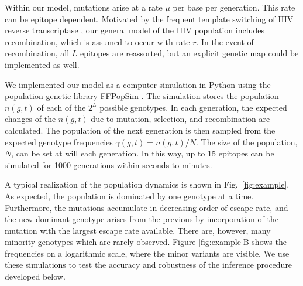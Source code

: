 \documentclass{frontiers}
\newcommand{\FIG}[1]{Fig.~\ref{fig:#1}}
\newcommand{\gt}{g}
\newcommand{\gtfreq}{\gamma}
\begin{document}
Within our model, mutations arise at a rate
$\mu$ per base per generation. This rate can be epitope dependent. 
Motivated by the frequent template switching of HIV reverse transcriptase 
\citep{Levy:2004p23309}, our general
model of the HIV population includes recombination, which is assumed to occur
with rate $r$. In the event of recombination, all $L$ epitopes are
reassorted, but an explicit genetic map could be implemented as well.

We implemented our model as a computer simulation in Python using the population genetic
library FFPopSim \citep{zanini_ffpopsim:_2012}. 
The simulation stores the population $n(\gt,t)$ of each of the $2^L$
possible genotypes. In each generation, the expected changes of the $n(\gt,t)$
due to mutation, selection, and recombination are calculated. The population of
the next generation is then sampled from the expected genotype frequencies
$\gtfreq(\gt,t) = n(\gt,t)/N$.
The size of the population, $N$, can be set at will each generation. In this way, up to
15 epitopes can be simulated for 1000 generations within seconds to minutes. 

A typical realization of the population dynamics is shown in
\FIG{example}. As expected, the population is dominated by one genotype at a
time.
Furthermore, the mutations accumulate in decreasing order of escape rate, and the new
dominant genotype arises from the previous by incorporation of the mutation with
the largest escape rate available. There are, however, many minority genotypes which
are rarely observed. Figure \ref{fig:example}B shows the frequencies on a
logarithmic scale, where the minor variants are visible. We use these
simulations to test the accuracy and robustness 
of the inference procedure developed below.
\end{document}
